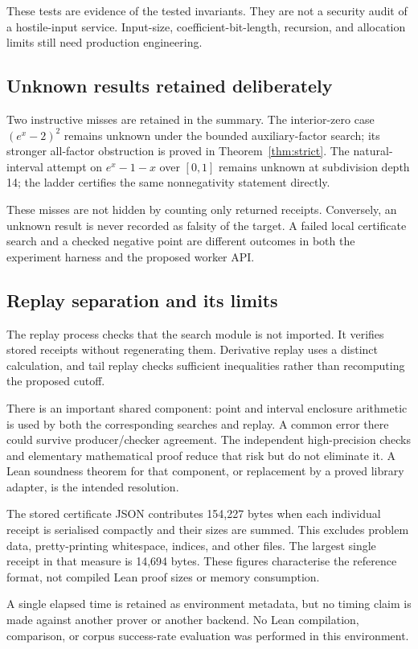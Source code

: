 These tests are evidence of the tested invariants. They are not a security
audit of a hostile-input service. Input-size, coefficient-bit-length, recursion,
and allocation limits still need production engineering.

\subsection{Unknown results retained deliberately}

Two instructive misses are retained in the summary. The interior-zero case
$(e^x-2)^2$ remains unknown under the bounded auxiliary-factor search; its
stronger all-factor obstruction is proved in Theorem~\ref{thm:strict}. The
natural-interval attempt on $e^x-1-x$ over $[0,1]$ remains unknown at subdivision
depth 14; the ladder certifies the same nonnegativity statement directly.

These misses are not hidden by counting only returned receipts. Conversely,
an unknown result is never recorded as falsity of the target. A failed local
certificate search and a checked negative point are different outcomes in both
the experiment harness and the proposed worker API.

\subsection{Replay separation and its limits}

The replay process checks that the search module is not imported. It verifies
stored receipts without regenerating them. Derivative replay uses a distinct
calculation, and tail replay checks sufficient inequalities rather than
recomputing the proposed cutoff.

There is an important shared component: point and interval enclosure arithmetic
is used by both the corresponding searches and replay. A common error there
could survive producer/checker agreement. The independent high-precision
checks and elementary mathematical proof reduce that risk but do not eliminate
it. A Lean soundness theorem for that component, or replacement by a proved
library adapter, is the intended resolution.

The stored certificate JSON contributes 154,227 bytes when each individual
receipt is serialised compactly and their sizes are summed. This excludes
problem data, pretty-printing whitespace, indices, and other files. The largest
single receipt in that measure is 14,694 bytes. These figures characterise the
reference format, not compiled Lean proof sizes or memory consumption.

A single elapsed time is retained as environment metadata, but no timing claim
is made against another prover or another backend. No Lean compilation,
 comparison, or corpus success-rate evaluation was performed in
this environment.

